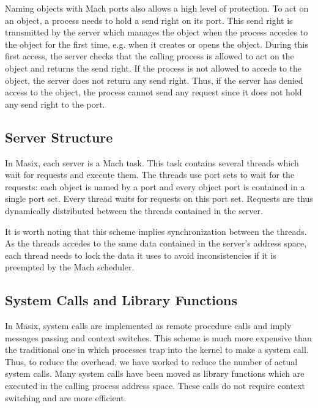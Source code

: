 	Naming objects with Mach ports also allows a high level of protection.
To act on an object, a process needs to hold a send right on its port. This
send right is transmitted by the server which manages the object when the
process accedes to the object for the first time, e.g. when it creates or
opens the object. During this first access, the server checks that the calling
process is allowed to act on the object and returns the send right. If the
process is not allowed to accede to the object, the server does not return
any send right. Thus, if the server has denied access to the object, the
process cannot send any request since it does not hold any send right to the
port.


\subsection {Server Structure}

	In Masix, each server is a Mach task. This task contains several
threads which wait for requests and execute them. The threads use port sets
to wait for the requests: each object is named by a port and every object
port is contained in a single port set. Every thread waits for requests on
this port set. Requests are thus dynamically distributed between the
threads contained in the server.

	It is worth noting that this scheme implies synchronization between
the threads. As the threads accedes to the same data contained in the server's
address space, each thread needs to lock the data it uses to avoid
inconsistencies if it is preempted by the Mach scheduler.

\subsection {System Calls and Library Functions}

	In Masix, system calls are implemented as remote procedure calls and
imply messages passing and context switches. This scheme is much more expensive
than the traditional one in which processes trap into the kernel to make a
system call. Thus, to reduce the overhead, we have worked to reduce the number
of actual system calls. Many system calls have been moved as library functions
which are executed in the calling process address space. These calls do not
require context switching and are more efficient.

